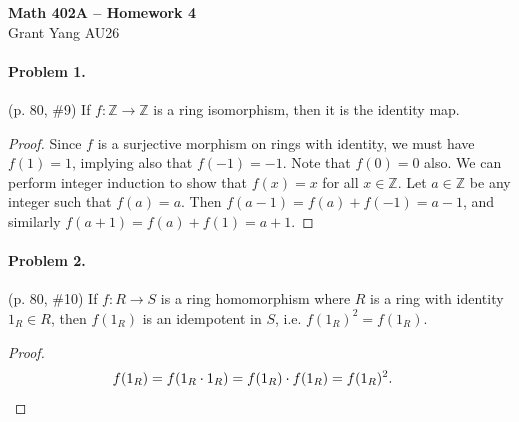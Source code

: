 \documentclass[12pt]{article}
\begin{document}
\begin{center} 
    {\large \textbf{Math 402A -- Homework 4}}
    \smallskip \\ 
    Grant Yang \hspace{1em} AU26
\end{center}

\paragraph{Problem 1.} (p. 80, \#9)
If $f : \mathbb Z \to \mathbb Z$ is a ring isomorphism, then it is the identity map.

\begin{proof}
    Since $f$ is a surjective morphism on rings with identity, we must have $f(1) = 1$, implying also that $f(-1) = -1$. Note that $f(0) = 0$ also. We can perform integer induction to show that $f(x) = x$ for all $x \in \mathbb Z$. Let $a \in \mathbb Z$ be any integer such that $f(a) = a$. Then $f(a - 1) = f(a) + f(-1) = a - 1$, and similarly $f(a + 1) = f(a) + f(1) = a + 1$. 
\end{proof}

\paragraph{Problem 2.} (p. 80, \#10)
If $f : R \to S$ is a ring homomorphism where $R$ is a ring with identity $1_R \in R$, then $f(1_R)$ is an idempotent in $S$, i.e. $f(1_R)^2 = f(1_R)$.

\begin{proof}
    \leavevmode\vadjust{\kern-\dimexpr\abovedisplayskip+\baselineskip\relax}
    \begin{align*}
        f(1_R) = f(1_R \cdot 1_R) = f(1_R) \cdot f(1_R) = f(1_R)^2. &
        \qedhere
    \end{align*}
\end{proof}
\end{document}
